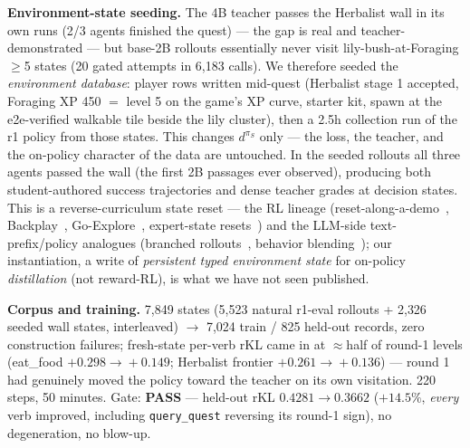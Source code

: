 \documentclass[11pt]{article}
\begin{document}
\textbf{Environment-state seeding.} The 4B teacher passes the Herbalist wall in its own
runs (2/3 agents finished the quest) --- the gap is real and teacher-demonstrated --- but
base-2B rollouts essentially never visit lily-bush-at-Foraging$\ge$5 states (20 gated attempts
in 6{,}183 calls). We therefore seeded the \emph{environment database}: player rows written
mid-quest (Herbalist stage 1 accepted, Foraging XP 450 $=$ level 5 on the game's XP curve,
starter kit, spawn at the e2e-verified walkable tile beside the lily cluster), then a 2.5h
collection run of the r1 policy from those states. This changes $d^{\pi_S}$ only --- the loss,
the teacher, and the on-policy character of the data are untouched. In the seeded rollouts all
three agents passed the wall (the first 2B passages ever observed), producing both
student-authored success trajectories and dense teacher grades at decision states. This is a
reverse-curriculum state reset --- the RL lineage (reset-along-a-demo~\cite{salchen},
Backplay~\cite{backplay}, Go-Explore~\cite{goexplore}, expert-state resets~\cite{reset5050}) and
the LLM-side text-prefix/policy analogues (branched rollouts~\cite{bread}, behavior
blending~\cite{trb}); our instantiation, a write of \emph{persistent typed environment state} for
on-policy \emph{distillation} (not reward-RL), is what we have not seen published.

\textbf{Corpus and training.} 7{,}849 states (5{,}523 natural r1-eval rollouts + 2{,}326 seeded
wall states, interleaved) $\rightarrow$ 7{,}024 train / 825 held-out records, zero construction
failures; fresh-state per-verb rKL came in at $\approx$half of round-1 levels (eat\_food
$+0.298\!\rightarrow\!+0.149$; Herbalist frontier $+0.261\!\rightarrow\!+0.136$) --- round 1 had
genuinely moved the policy toward the teacher on its own visitation. 220 steps, 50 minutes.
Gate: \textbf{PASS} --- held-out rKL $0.4281 \rightarrow 0.3662$ ($+14.5\%$, \emph{every} verb
improved, including \texttt{query\_quest} reversing its round-1 sign), no degeneration, no
blow-up.
\end{document}
